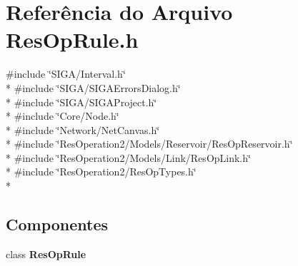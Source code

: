 \section{Referência do Arquivo Res\+Op\+Rule.\+h}
\label{_2_rule_2_res_op_rule_8h}
{\ttfamily \#include \char`\"{}S\+I\+G\+A/\+Interval.\+h\char`\"{}}\\*
{\ttfamily \#include \char`\"{}S\+I\+G\+A/\+S\+I\+G\+A\+Errors\+Dialog.\+h\char`\"{}}\\*
{\ttfamily \#include \char`\"{}S\+I\+G\+A/\+S\+I\+G\+A\+Project.\+h\char`\"{}}\\*
{\ttfamily \#include \char`\"{}Core/\+Node.\+h\char`\"{}}\\*
{\ttfamily \#include \char`\"{}Network/\+Net\+Canvas.\+h\char`\"{}}\\*
{\ttfamily \#include \char`\"{}Res\+Operation2/\+Models/\+Reservoir/\+Res\+Op\+Reservoir.\+h\char`\"{}}\\*
{\ttfamily \#include \char`\"{}Res\+Operation2/\+Models/\+Link/\+Res\+Op\+Link.\+h\char`\"{}}\\*
{\ttfamily \#include \char`\"{}Res\+Operation2/\+Res\+Op\+Types.\+h\char`\"{}}\\*
\subsection*{Componentes}
\begin{DoxyCompactItemize}
\item 
class {\bf Res\+Op\+Rule}
\end{DoxyCompactItemize}
